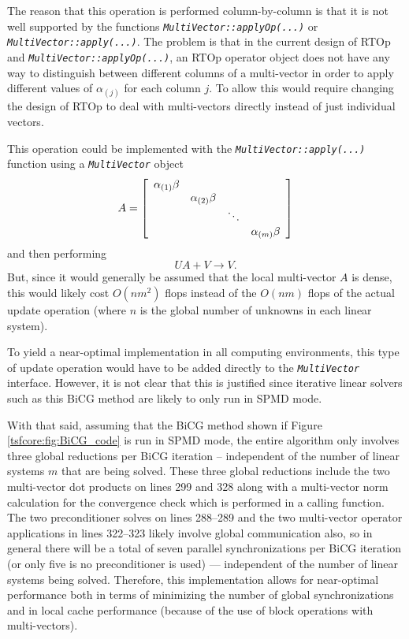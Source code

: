 The reason that this operation is performed column-by-column is that
it is not well supported by the functions
{}\texttt{\textit{Multi\-Vector\-::applyOp(\-...)}} or
{}\texttt{\textit{Multi\-Vector\-::apply(\-...)}}.  The problem is
that in the current design of RTOp and
{}\texttt{\textit{Multi\-Vector\-::applyOp(\-...)}}, an RTOp operator
object does not have any way to distinguish between different columns
of a multi-vector in order to apply different values of $\alpha_{(j)}$
for each column $j$.  To allow this would require changing the design
of RTOp to deal with multi-vectors directly instead of just individual
vectors.

This operation could be implemented with the
{}\texttt{\textit{Multi\-Vector\-::apply(\-...)}} function using a
{}\texttt{\textit{Multi\-Vector}} object
%
\[
A = {\bmat{cccc} \alpha_{(1)} \beta \\ & \alpha_{(2)} \beta \\ & & \ddots \\ & & & \alpha_{(m)} \beta \emat}
\]
%
and then performing
%
\[
U A + V \rightarrow V.
\]
%
But, since it would generally be assumed that the local multi-vector
$A$ is dense, this would likely cost $O(n m^2)$ flops instead of the
$O(n m)$ flops of the actual update operation (where $n$ is the global
number of unknowns in each linear system).

To yield a near-optimal implementation in all computing environments,
this type of update operation would have to be added directly to the
{}\texttt{\textit{Multi\-Vector}} interface.  However, it is not clear
that this is justified since iterative linear solvers such as this
BiCG method are likely to only run in SPMD mode.

With that said, assuming that the BiCG method shown if Figure
{}\ref{tsfcore:fig:BiCG_code} is run in SPMD mode, the entire
algorithm only involves three global reductions per BiCG iteration --
independent of the number of linear systems $m$ that are being solved.
These three global reductions include the two multi-vector dot
products on lines 299 and 328 along with a multi-vector norm
calculation for the convergence check which is performed in a calling
function.  The two preconditioner solves on lines 288--289 and the two
multi-vector operator applications in lines 322--323 likely involve
global communication also, so in general there will be a total of
seven parallel synchronizations per BiCG iteration (or only five is no
preconditioner is used) --- independent of the number of linear
systems being solved.  Therefore, this implementation allows for
near-optimal performance both in terms of minimizing the number of
global synchronizations and in local cache performance (because of the
use of block operations with multi-vectors).

